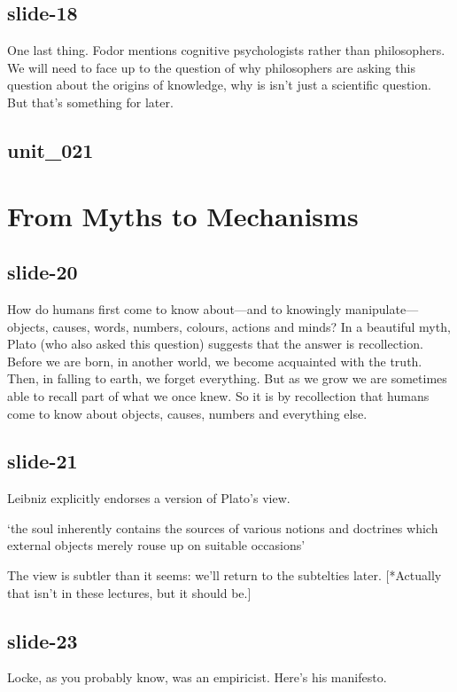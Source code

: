 \documentclass[12pt,\papersize]{extarticle}
\begin{document}
 
 
\subsection{slide-18}
One last thing. Fodor mentions cognitive psychologists rather than philosophers. We will need to face up to the question of why philosophers are asking this question about the origins of knowledge, why is isn't just a scientific question. But that's something for later.
 
 
 
\subsection{unit\_021}
 
 
\section{From Myths to Mechanisms}
 
 
 
\subsection{slide-20}
How do humans first come to know about---and to knowingly manipulate---objects, causes, words, numbers, colours, actions and minds? In a beautiful myth, Plato (who also asked this question) suggests that the answer is recollection. Before we are born, in another world, we become acquainted with the truth. Then, in falling to earth, we forget everything. But as we grow we are sometimes able to recall part of what we once knew. So it is by recollection that humans come to know about objects, causes, numbers and everything else.
 
 
 
\subsection{slide-21}
Leibniz explicitly endorses a version of Plato's view.
 
‘the soul inherently contains the sources of various notions and doctrines which external objects merely rouse up on suitable occasions’
\citep[p.\ 48]{Leibniz:1996bl}
 
The view is subtler than it seems: we'll return to the subtelties later. [*Actually that isn't in these lectures, but it should be.]
 
 
 
\subsection{slide-23}
Locke, as you probably know, was an empiricist. Here's his manifesto.
 
\end{document}
